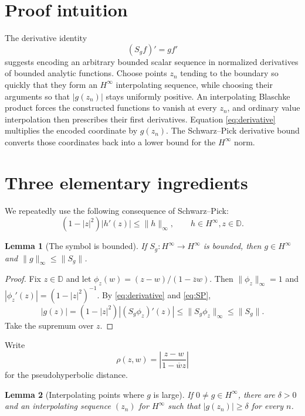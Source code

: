 \documentclass[11pt]{article}
\newtheorem{lemma}{Lemma}
\newcommand{\D}{\mathbb D}
\begin{document}
\section{Proof intuition}

The derivative identity
\begin{equation}\label{eq:derivative}
 (S_gf)'=gf'
\end{equation}
suggests encoding an arbitrary bounded scalar sequence in normalized
derivatives of bounded analytic functions.  Choose points $z_n$ tending to
the boundary so quickly that they form an $H^\infty$ interpolating sequence,
while choosing their arguments so that $|g(z_n)|$ stays uniformly positive.
An interpolating Blaschke product forces the constructed functions to vanish
at every $z_n$, and ordinary value interpolation then prescribes their first
derivatives.  Equation \eqref{eq:derivative} multiplies the encoded coordinate
by $g(z_n)$.  The Schwarz--Pick derivative bound converts those coordinates
back into a lower bound for the $H^\infty$ norm.

\section{Three elementary ingredients}

We repeatedly use the following consequence of Schwarz--Pick:
\begin{equation}\label{eq:SP}
 (1-|z|^2)|h'(z)|\le \|h\|_\infty,
 \qquad h\in H^\infty, z\in\D.
\end{equation}

\begin{lemma}[The symbol is bounded]\label{lem:symbol}
If $S_g:H^\infty\to H^\infty$ is bounded, then
$g\in H^\infty$ and $\|g\|_\infty\le\|S_g\|$.
\end{lemma}

\begin{proof}
Fix $z\in\D$ and let
$\phi_z(w)=(z-w)/(1-\overline zw)$.  Then $\|\phi_z\|_\infty=1$ and
$|\phi_z'(z)|=(1-|z|^2)^{-1}$.  By \eqref{eq:derivative} and
\eqref{eq:SP},
\[
 |g(z)|=(1-|z|^2)|(S_g\phi_z)'(z)|
 \le \|S_g\phi_z\|_\infty\le\|S_g\|.
\]
Take the supremum over $z$.
\end{proof}

Write
\[
 \rho(z,w)=\left|\frac{z-w}{1-\overline wz}\right|
\]
for the pseudohyperbolic distance.

\begin{lemma}[Interpolating points where $g$ is large]\label{lem:points}
If $0\ne g\in H^\infty$, there are $\delta>0$ and an interpolating sequence
$(z_n)$ for $H^\infty$ such that $|g(z_n)|\ge\delta$ for every $n$.
\end{lemma}
\end{document}
